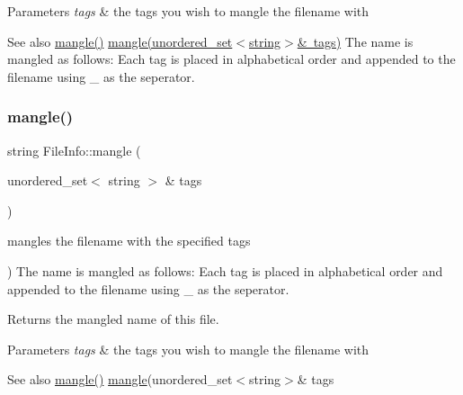 \begin{DoxyParams}{Parameters}
{\em tags} & the tags you wish to mangle the filename with \\
\hline
\end{DoxyParams}
\begin{DoxySeeAlso}{See also}
\mbox{\hyperlink{classFileInfo_a96827c2e48fb1a15d468e9afd545383e}{mangle()}} \mbox{\hyperlink{classFileInfo_aec8a60addbed54097f6cac0a6a516717}{mangle(unordered\+\_\+set$<$string$>$\& tags)}} The name is mangled as follows\+: Each tag is placed in alphabetical order and appended to the filename using \textquotesingle{}\+\_\+\textquotesingle{} as the seperator. 
\end{DoxySeeAlso}
\mbox{\label{classFileInfo_aec8a60addbed54097f6cac0a6a516717}} 
\subsubsection{\texorpdfstring{mangle()}{mangle()}\hspace{0.1cm}{\footnotesize\ttfamily [3/3]}}
{\footnotesize\ttfamily string File\+Info\+::mangle (\begin{DoxyParamCaption}\item[{unordered\+\_\+set$<$ string $>$ \&}]{tags }\end{DoxyParamCaption})}



mangles the filename with the specified tags 

) The name is mangled as follows\+: Each tag is placed in alphabetical order and appended to the filename using \textquotesingle{}\+\_\+\textquotesingle{} as the seperator.

\begin{DoxyReturn}{Returns}
the mangled name of this file. 
\end{DoxyReturn}

\begin{DoxyParams}{Parameters}
{\em tags} & the tags you wish to mangle the filename with \\
\hline
\end{DoxyParams}
\begin{DoxySeeAlso}{See also}
\mbox{\hyperlink{classFileInfo_a96827c2e48fb1a15d468e9afd545383e}{mangle()}} \mbox{\hyperlink{classFileInfo_a96827c2e48fb1a15d468e9afd545383e}{mangle}}(unordered\+\_\+set$<$string$>$\& tags 
\end{DoxySeeAlso}
\mbox{\label{classFileInfo_a0e74605dd535e73027ad1c1c6242db09}} 
